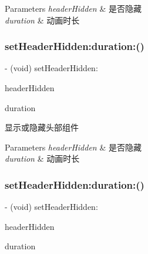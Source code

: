 \begin{DoxyParams}{Parameters}
{\em header\+Hidden} & 是否隐藏 \\
\hline
{\em duration} & 动画时长 \\
\hline
\end{DoxyParams}
\mbox{\label{interface_v_t_magic_view_ac8808d94ff7db43424b201f33935c488}} 
\subsubsection{\texorpdfstring{set\+Header\+Hidden\+:duration\+:()}{setHeaderHidden:duration:()}\hspace{0.1cm}{\footnotesize\ttfamily [2/3]}}
{\footnotesize\ttfamily -\/ (void) set\+Header\+Hidden\+: \begin{DoxyParamCaption}\item[{(B\+O\+OL)}]{header\+Hidden }\item[{duration:(C\+G\+Float)}]{duration }\end{DoxyParamCaption}}

显示或隐藏头部组件


\begin{DoxyParams}{Parameters}
{\em header\+Hidden} & 是否隐藏 \\
\hline
{\em duration} & 动画时长 \\
\hline
\end{DoxyParams}
\mbox{\label{interface_v_t_magic_view_ac8808d94ff7db43424b201f33935c488}} 
\subsubsection{\texorpdfstring{set\+Header\+Hidden\+:duration\+:()}{setHeaderHidden:duration:()}\hspace{0.1cm}{\footnotesize\ttfamily [3/3]}}
{\footnotesize\ttfamily -\/ (void) set\+Header\+Hidden\+: \begin{DoxyParamCaption}\item[{(B\+O\+OL)}]{header\+Hidden }\item[{duration:(C\+G\+Float)}]{duration }\end{DoxyParamCaption}}

